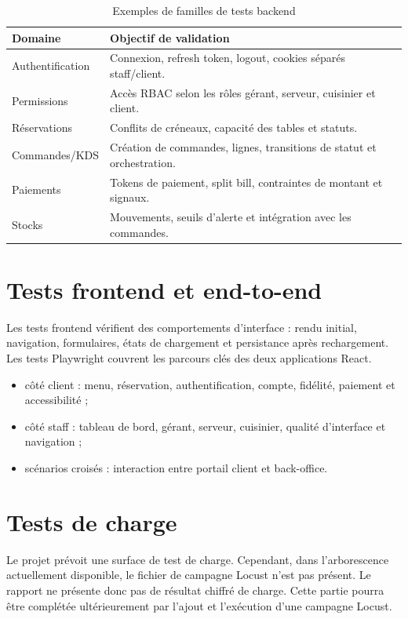 \begin{table}[H]
\centering
\caption{Exemples de familles de tests backend}
\begin{tabular}{p{4cm}p{9cm}}
\toprule
\textbf{Domaine} & \textbf{Objectif de validation} \\
\midrule
Authentification & Connexion, refresh token, logout, cookies séparés staff/client. \\
Permissions & Accès RBAC selon les rôles gérant, serveur, cuisinier et client. \\
Réservations & Conflits de créneaux, capacité des tables et statuts. \\
Commandes/KDS & Création de commandes, lignes, transitions de statut et orchestration. \\
Paiements & Tokens de paiement, split bill, contraintes de montant et signaux. \\
Stocks & Mouvements, seuils d'alerte et intégration avec les commandes. \\
\bottomrule
\end{tabular}
\end{table}

\section{Tests frontend et end-to-end}
Les tests frontend vérifient des comportements d'interface : rendu initial, navigation, formulaires, états de chargement et persistance après rechargement. Les tests Playwright couvrent les parcours clés des deux applications React.

\begin{itemize}[leftmargin=1.2cm]
  \item côté client : menu, réservation, authentification, compte, fidélité, paiement et accessibilité ;
  \item côté staff : tableau de bord, gérant, serveur, cuisinier, qualité d'interface et navigation ;
  \item scénarios croisés : interaction entre portail client et back-office.
\end{itemize}

\section{Tests de charge}
Le projet prévoit une surface de test de charge. Cependant, dans l'arborescence actuellement disponible, le fichier de campagne Locust n'est pas présent. Le rapport ne présente donc pas de résultat chiffré de charge. Cette partie pourra être complétée ultérieurement par l'ajout et l'exécution d'une campagne Locust.

